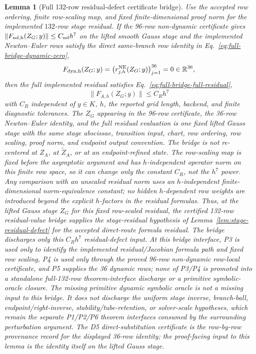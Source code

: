 \documentclass[preprint,12pt]{elsarticle}
\newtheorem{lemma}{Lemma}
\begin{document}
\begin{lemma}[Full 132-row residual-defect certificate bridge]
\label{lem:full-132-row-residual-bridge}
Use the accepted row ordering, finite row-scaling map, and fixed
finite-dimensional proof norm for the implemented \(132\)-row stage residual.
If the 96-row non-dynamic certificate gives
\(\|F_{\rm nd,h}(Z_G;y)\|\le C_{\rm nd}h^7\) on the lifted smooth Gauss
stage and the implemented Newton--Euler rows satisfy the direct
same-branch row identity in Eq.~\eqref{eq:full-bridge-dynamic-zero},
\begin{equation}
\label{eq:full-bridge-dynamic-zero}
  F_{\rm dyn,h}(Z_G;y)
  =\bigl(r^{\rm NE}_{j,h}(Z_G;y)\bigr)_{j=1}^{36}
  =0\in\mathbb R^{36},
\end{equation}
then the full
implemented residual satisfies Eq.~\eqref{eq:full-bridge-full-residual},
\begin{equation}
\label{eq:full-bridge-full-residual}
  \|F_{A,h}(Z_G;y)\|\le C_Rh^7
\end{equation}
with \(C_R\) independent of \(y\in K\), \(h\), the reported grid length,
backend, and finite diagnostic tolerances. The \(Z_G\) appearing in the
96-row certificate, the 36-row Newton--Euler identity, and the full residual
evaluation is one fixed lifted Gauss stage with the same stage abscissae,
transition input, chart, row ordering, row scaling, proof norm, and endpoint
output convention.  The bridge is not re-centered at \(Z_A\), at
\(\widetilde Z_A\), or at an endpoint-refined state. The row-scaling map is fixed before the
asymptotic argument and has \(h\)-independent operator norm on this finite
row space, so it can change only the constant \(C_R\), not the \(h^7\)
power. Any comparison with an unscaled residual norm uses an
\(h\)-independent finite-dimensional norm-equivalence constant; no hidden
\(h\)-dependent row weights are introduced beyond the explicit \(h\)-factors
in the residual formulas. Thus, at the lifted Gauss stage \(Z_G\) for this
fixed row-scaled residual, the certified 132-row residual-value bridge supplies the
stage-residual hypothesis of Lemma~\ref{lem:stage-residual-defect} for the
accepted direct-route formula residual. The bridge discharges only this
\(C_Rh^7\) residual-defect input. At this bridge interface, P3 is used only
to identify the implemented residual/Jacobian formula path and fixed row
scaling, P4 is used only through the proved 96-row non-dynamic row-local
certificate, and P5 supplies the 36 dynamic rows; none of P3/P4 is promoted
into a standalone full-132-row theorem-interface discharge or a primitive
symbolic-oracle closure. The missing primitive dynamic symbolic oracle is not
a missing input to this bridge. It does not discharge the uniform stage inverse,
branch-ball, endpoint/right-inverse, stability/tube-retention, or solver-scale
hypotheses, which remain the separate P1/P2/P6 theorem interfaces consumed by
the surrounding perturbation argument. The D5 direct-substitution certificate
is the row-by-row provenance record for the displayed 36-row identity; the
proof-facing input to this lemma is the identity itself on the lifted Gauss
stage.
\end{lemma}
\end{document}
